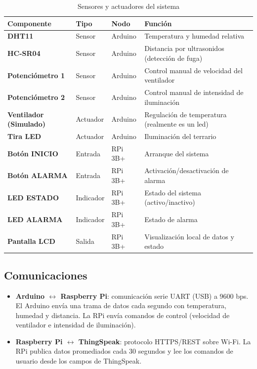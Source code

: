 \documentclass[12pt, a4paper]{article}
\begin{document}
\begin{table}[H]
    \centering
    \caption{Sensores y actuadores del sistema}
    \label{tab:componentes}
    \renewcommand{\arraystretch}{1.3}
    \begin{tabularx}{\textwidth}{>{\bfseries}l l l X}
        \toprule
        Componente   & Tipo      & Nodo       & Función \\
        \midrule
        DHT11        & Sensor    & Arduino    & Temperatura y humedad relativa \\
        HC-SR04      & Sensor    & Arduino    & Distancia por ultrasonidos (detección de fuga) \\
        Potenciómetro 1 & Sensor & Arduino    & Control manual de velocidad del ventilador \\
        Potenciómetro 2 & Sensor & Arduino    & Control manual de intensidad de iluminación \\
        Ventilador (Simulado) & Actuador & Arduino & Regulación de temperatura (realmente es un led) \\
        Tira LED     & Actuador  & Arduino    & Iluminación del terrario \\
        Botón INICIO & Entrada   & RPi 3B+    & Arranque del sistema \\
        Botón ALARMA & Entrada   & RPi 3B+    & Activación/desactivación de alarma \\
        LED ESTADO   & Indicador & RPi 3B+    & Estado del sistema (activo/inactivo) \\
        LED ALARMA   & Indicador & RPi 3B+    & Estado de alarma \\
        Pantalla LCD & Salida    & RPi 3B+    & Visualización local de datos y estado \\
        \bottomrule
    \end{tabularx}
\end{table}

\subsection{Comunicaciones}

\begin{itemize}[noitemsep]
    \item \textbf{Arduino $\leftrightarrow$ Raspberry Pi}: comunicación serie UART
          (USB) a 9600 bps. El Arduino envía una trama de datos cada segundo con
          temperatura, humedad y distancia. La RPi envía comandos de control
          (velocidad de ventilador e intensidad de iluminación).
    \item \textbf{Raspberry Pi $\leftrightarrow$ ThingSpeak}: protocolo HTTPS/REST
          sobre Wi-Fi. La RPi publica datos promediados cada 30 segundos y lee
          los comandos de usuario desde los campos de ThingSpeak.
\end{itemize}
\end{document}
